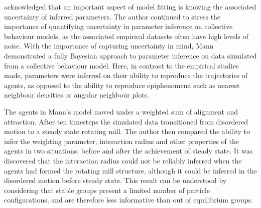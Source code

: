 \textcite{mann11} acknowledged that an important aspect of model fitting is knowing the associated uncertainty of inferred parameters. The author continued to stress the importance of quantifying uncertainty in parameter inference on collective behaviour models, as the associated empirical datasets often have high levels of noise. With the importance of capturing uncertainty in mind, Mann demonstrated a fully Bayesian approach to parameter inference on data simulated from a collective behaviour model. Here, in contrast to the empirical studies made, parameters were inferred on their ability to reproduce the trajectories of agents, as opposed to the ability to reproduce epiphenomena such as nearest neighbour densities or angular neighbour plots.

The agents in Mann's model moved under a weighted sum of alignment and attraction. After ten timesteps the simulated data transitioned from disordered motion to a steady state rotating mill. The author then compared the ability to infer the weighting parameter, interaction radius and other properties of the agents in two situations: before and after the achievement of steady state. It was discovered that the interaction radius could not be reliably inferred when the agents had formed the rotating mill structure, although it could be inferred in the disordered motion before steady state. This result can be understood by considering that stable groups present a limited number of particle configurations, and are therefore less informative than out of equilibrium groups.
